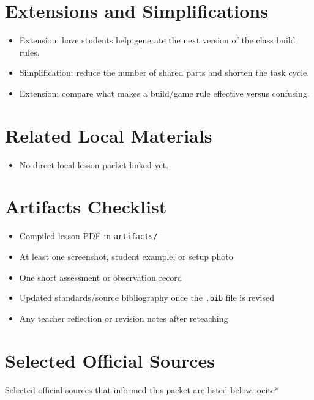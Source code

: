 \documentclass[11pt]{article}
\begin{document}
\section*{Extensions and Simplifications}
\begin{itemize}[leftmargin=*]
\item Extension: have students help generate the next version of the class build rules.
\item Simplification: reduce the number of shared parts and shorten the task cycle.
\item Extension: compare what makes a build/game rule effective versus confusing.
\end{itemize}

\section*{Related Local Materials}
\begin{itemize}[leftmargin=*]
\item No direct local lesson packet linked yet.
\end{itemize}

\section*{Artifacts Checklist}
\begin{itemize}[leftmargin=*]
\item Compiled lesson PDF in \texttt{artifacts/}
\item At least one screenshot, student example, or setup photo
\item One short assessment or observation record
\item Updated standards/source bibliography once the \texttt{.bib} file is revised
\item Any teacher reflection or revision notes after reteaching
\end{itemize}

\section*{Selected Official Sources}
Selected official sources that informed this packet are listed below.
ocite{*}



\end{document}
